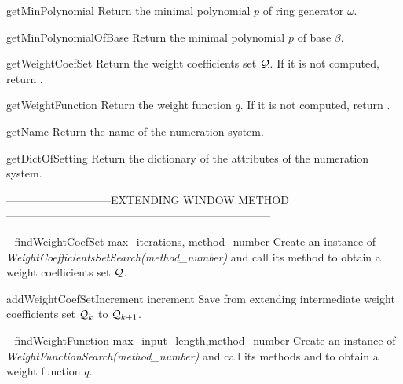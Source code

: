 \begin{method}{getMinPolynomial}{}
Return the minimal polynomial $p$ of ring generator $\omega$.
\end{method}

\begin{method}{getMinPolynomialOfBase}{}
Return the minimal polynomial $p$ of base $\beta$.
\end{method}

\begin{method}{getWeightCoefSet}{}
Return the weight coefficients set $\mathcal{Q}$. If it is not computed, return .
\end{method}


\begin{method}{getWeightFunction}{}
Return the weight function $q$. If it is not computed, return .
\end{method}


\begin{method}{getName}{}
Return the name of the numeration system.
\end{method}


\begin{method}{getDictOfSetting}{}
Return the dictionary of the attributes of the numeration system.
\end{method}


-----------------------------EXTENDING WINDOW METHOD------------------------------------------------------------------------

\begin{method}{\_findWeightCoefSet}{ max\_iterations, method\_number}
Create an instance of \emph{WeightCoefficientsSetSearch(method\_number)} and call its method  to obtain a weight coefficients set $\mathcal{Q}$.
\end{method}

\begin{method}{addWeightCoefSetIncrement}{ increment}
Save  from extending intermediate weight coefficients set $\mathcal{Q}_{k}$ to $\mathcal{Q}_{k+1}$.
\end{method}

\begin{method}{\_findWeightFunction}{ max\_input\_length,method\_number}
Create an instance of \emph{WeightFunctionSearch(method\_number)} and call its methods  and  to obtain a weight function $q$.
\end{method}


